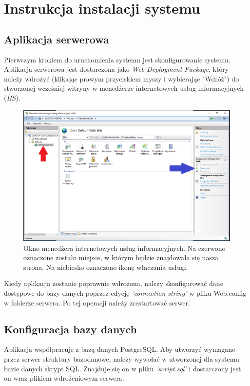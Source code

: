 \documentclass{article}
\begin{document}
\section{Instrukcja instalacji systemu}

	\subsection{Aplikacja serwerowa}
	
	Pierwszym krokiem do uruchomienia systemu jest skonfigurowanie systemu. Aplikacja serwerowa jest dostarczona jako \textit{Web Deployment Package}, który należy wdrożyć (klikając prawym przyciskiem myszy i wybierając "Wdróż") do stworzonej wcześniej witryny w menedżerze internetowych usług informacyjnych (\textit{IIS}). 
	\begin{figure}[H]			
		\centering
		\caption{Okno menedżera internetowych usług informacyjnych. Na czerwono oznaczone zostało miejsce, w którym będzie znajdowała się nasza strona. Na niebiesko oznaczono ikonę włączania usługi.}
		\includegraphics[width=1.0\textwidth]{iis}
	\end{figure}
	Kiedy aplikacja zostanie poprawnie wdrożona, należy skonfigurować dane dostępowe do bazy danych poprzez edycję \textit{'connection-string'} w pliku Web.config w folderze serwera. Po tej operacji należy zrestartować serwer.\\	
	
	\subsection{Konfiguracja bazy danych}
	
	Aplikacja współpracuje z bazą danych PostgreSQL. Aby utworzyć wymagane przez serwer struktury bazodanowe, należy wywołać w utworzonej dla systemu bazie danych skrypt SQL. Znajduje się on w pliku \textit{'script.sql'} i dostarczony jest on wraz plikiem wdrożeniowym serwera.
		
\end{document}
